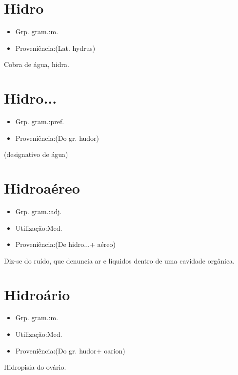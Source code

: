 \documentclass{article}
\begin{document}
\section{Hidro}
\begin{itemize}
\item {Grp. gram.:m.}
\end{itemize}
\begin{itemize}
\item {Proveniência:(Lat. \textunderscore hydrus\textunderscore )}
\end{itemize}
Cobra de água, hidra.
\section{Hidro...}
\begin{itemize}
\item {Grp. gram.:pref.}
\end{itemize}
\begin{itemize}
\item {Proveniência:(Do gr. \textunderscore hudor\textunderscore )}
\end{itemize}
(designativo de \textunderscore água\textunderscore )
\section{Hidroaéreo}
\begin{itemize}
\item {Grp. gram.:adj.}
\end{itemize}
\begin{itemize}
\item {Utilização:Med.}
\end{itemize}
\begin{itemize}
\item {Proveniência:(De \textunderscore hidro...\textunderscore  + \textunderscore aéreo\textunderscore )}
\end{itemize}
Diz-se do ruído, que denuncia ar e líquidos dentro de uma cavidade orgânica.
\section{Hidroário}
\begin{itemize}
\item {Grp. gram.:m.}
\end{itemize}
\begin{itemize}
\item {Utilização:Med.}
\end{itemize}
\begin{itemize}
\item {Proveniência:(Do gr. \textunderscore hudor\textunderscore  + \textunderscore oarion\textunderscore )}
\end{itemize}
Hidropisia do ovário.
\end{document}
